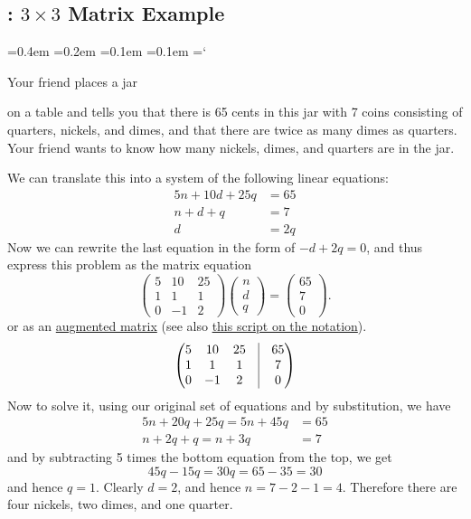 
\subsection{\whatIsTitle: $3 \times 3$ Matrix Example}

{\ttfamily
{}\font=0.4em
\font=0.2em
\font=0.1em
\font=0.1em
\hyphenchar\font=`\-

\hypertarget{scripts_what_is_linear_algebra_3_3_matrix}{Your friend places a jar} on a table and tells you that there is 65 cents in this jar with 7 coins consisting of quarters, nickels, and dimes, and that there are twice as many dimes as quarters. Your friend wants to know how many nickels, dimes, and quarters are in the jar.

We can translate this into a system of the following linear equations:
\begin{align*}
5n + 10d + 25q & = 65
\\ n + d + q & = 7
\\ d & = 2q
\end{align*}
Now we can rewrite the last equation in the form of $-d + 2q = 0$, and thus express this problem as the matrix equation
\[
\begin{pmatrix}
5 & 10 & 25 \\
1 & 1 & 1 \\
0 & -1 & 2
\end{pmatrix} \begin{pmatrix}n\\d\\q\end{pmatrix} = \begin{pmatrix}65\\7\\0\end{pmatrix}.
\]
or as an \hyperlink{augmented_matrix}{augmented matrix} (see also \hyperlink{script_gaussian_elimination_more}{this script on the notation}).
\[
\begin{pmatrix}
5 & 10 & 25 & \vline & 65\\
1 & 1 & 1 & \vline & 7 \\
0 & -1 & 2 & \vline & 0
\end{pmatrix}
\]
Now to solve it, using our original set of equations and by substitution, we have
\begin{align*}
5n + 20q + 25q = 5n + 45q & = 65
\\ n + 2q + q = n + 3q & = 7
\end{align*}
and by subtracting 5 times the bottom equation from the top, we get
\[
45q - 15q = 30q = 65 - 35 = 30
\]
and hence $q = 1$. Clearly $d = 2$, and hence $n = 7 - 2 - 1 = 4$. Therefore there are four nickels, two dimes, and one quarter.

} %

\newpage
